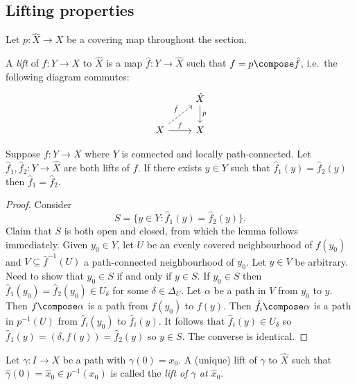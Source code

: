 \documentclass[a4paper]{article}
\begin{document}
\subsection{Lifting properties}

Let \(p: \hat X \to X\) be a covering map throughout the section.

\begin{definition}[lift]
  A \emph{lift} of \(f: Y \to X\) to \(\hat X\) is a map \(\hat f: Y \to \hat X\) such that \(f = p \compose \hat f\), i.e.\ the following diagram commutes:
  \[
    \begin{tikzcd}
      & \hat X \ar[d, "p"] \\
      X \ar[ur, "\hat f", dashed] \ar[r, "f"] & X
    \end{tikzcd}
  \]
\end{definition}

\begin{lemma}
  Suppose \(f: Y \to X\) where \(Y\) is connected and locally path-connected. %
  Let \(\hat f_1, \hat f_2: Y \to \hat X\) are both lifts of \(f\). If there exists \(y \in Y\) such that \(\hat f_1(y) = \hat f_2(y)\) then \(\hat f_1 = \hat f_2\).
\end{lemma}

\begin{proof}
  Consider
  \[
    S = \{y \in Y: \hat f_1(y) = \hat f_2(y)\}.
  \]
  Claim that \(S\) is both open and closed, from which the lemma follows immediately. Given \(y_0 \in Y\), let \(U\) be an evenly covered neighbourhood of \(f(y_0)\) and \(V \subseteq \hat f^{-1}(U)\) a path-connected neighbourhood of \(y_0\). Let \(y \in V\) be arbitrary. Need to show that \(y_0 \in S\) if and only if \(y \in S\). If \(y_0 \in S\) then \(\hat f_1(y_0) = \hat f_2(y_0) \in U_\delta\) for some \(\delta \in \Delta_U\). Let \(\alpha\) be a path in \(V\) from \(y_0\) to \(y\). Then \(f \compose \alpha\) is a path from \(f(y_0)\) to \(f(y)\). Then \(\hat f_i \compose \alpha\) is a path in \(p^{-1}(U)\) from \(\hat f_i(y_0)\) to \(\hat f_i(y)\). It follows that \(\hat f_i(y) \in U_\delta\) so \(\hat f_1(y) = (\delta, f(y)) = \hat f_2(y)\) so \(y \in S\). The converse is identical.
\end{proof}

\begin{definition}
  Let \(\gamma: I \to X\) be a path with \(\gamma(0) = x_0\). A (unique) lift of \(\gamma\) to \(\hat X\) such that \(\hat \gamma(0) = \hat x_0 \in p^{-1}(x_0)\) is called the \emph{lift of \(\gamma\) at \(\hat x_0\)}.
\end{definition}
\end{document}
